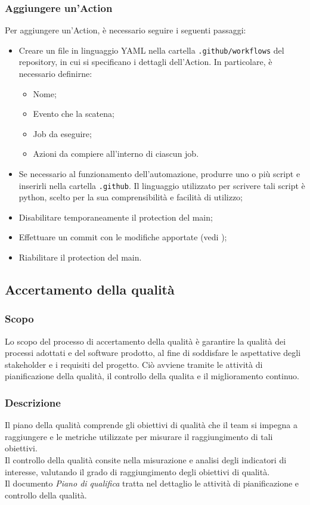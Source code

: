 \subsubsection{Aggiungere un'Action}
Per aggiungere un'Action, è necessario seguire i seguenti passaggi:
\begin{itemize}
    \item Creare un file in linguaggio YAML nella cartella \texttt{.github/workflows} del
          repository, in cui si specificano i dettagli dell'Action. In particolare, è
          necessario definirne:
          \begin{itemize}
              \item Nome;
              \item Evento che la scatena;
              \item Job da eseguire;
              \item Azioni da compiere all'interno di ciascun job.
          \end{itemize}
    \item Se necessario al funzionamento dell'automazione, produrre uno o più script e
          inserirli nella cartella \texttt{.github}. Il linguaggio utilizzato per
          scrivere tali script è python, scelto per la sua comprensibilità e facilità di
          utilizzo;
    \item Disabilitare temporaneamente il protection del main;
    \item Effettuare un commit con le modifiche apportate (vedi );
    \item Riabilitare il protection del main.
\end{itemize}

\subsection{Accertamento della qualità}
\subsubsection{Scopo}
Lo scopo del processo di accertamento della qualità è garantire la qualità dei
processi adottati e del software prodotto, al fine di soddisfare le aspettative
degli stakeholder e i requisiti del progetto. Ciò avviene tramite le attività
di pianificazione della qualità, il controllo della qualita e il miglioramento
continuo.
\subsubsection{Descrizione}
Il piano della qualità comprende gli obiettivi di qualità che il team si
impegna a raggiungere e le metriche utilizzate per misurare il raggiungimento
di tali obiettivi. \\ Il controllo della qualità consite nella misurazione e
analisi degli indicatori di interesse, valutando il grado di raggiungimento
degli obiettivi di qualità. \\ Il documento \textit{Piano di qualifica} tratta
nel dettaglio le attività di pianificazione e controllo della qualità. \\
